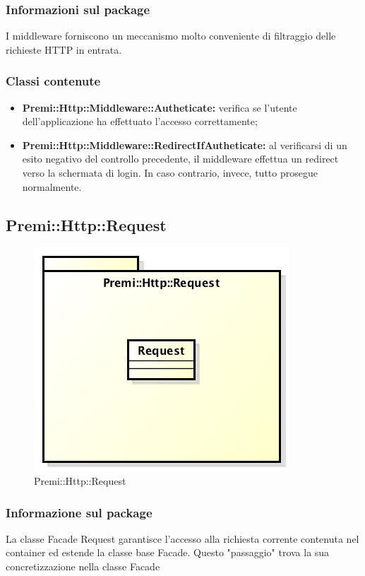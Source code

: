 	\subsubsection*{Informazioni sul package}
	I middleware forniscono un meccanismo molto conveniente di filtraggio delle richieste HTTP in entrata.
	\subsubsection*{Classi contenute}
		\begin{itemize}
			\item \textbf{Premi::Http::Middleware::Autheticate:} verifica se l'utente dell'applicazione ha effettuato l'accesso correttamente;
			\item \textbf{Premi::Http::Middleware::RedirectIfAutheticate:} al verificarsi di un esito negativo del controllo precedente, il middleware effettua un redirect verso la schermata di login. In caso contrario, invece, tutto prosegue normalmente.
		\end{itemize}
\newpage
\subsection{Premi::Http::Request}
\begin{figure}[h]
\centering
\includegraphics[width=0.6\linewidth]{img/premi_http_request}
\caption[Premi::Http::Request]{Premi::Http::Request}
\label{fig:premi_http_request}
\end{figure}
	\subsubsection*{Informazione sul package}
	La classe Facade Request garantisce l'accesso alla richiesta corrente contenuta nel container ed estende la classe base Facade. Questo "passaggio" trova la sua concretizzazione nella classe Facade

